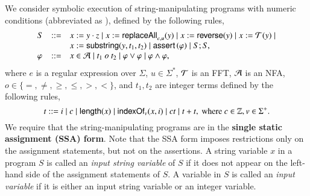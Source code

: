 
We consider symbolic execution of string-manipulating programs with numeric conditions (abbreviated as {\slint}), defined by the following rules, 
%
\[
\begin{array}{l c l}
S &::= &  x:= y \cdot z \mid x:= \mathsf{replaceAll}_{e,u}(y) \mid   x:=\mathsf{reverse}(y) \mid x:=\mathcal{T}(y) \mid \\
& & x := \mathsf{substring}(y, t_1, t_2)  \mid \textsf{assert}\left(\varphi\right)  \mid S;S, \\
\varphi &::= & x \in \mathcal{A} \mid t_1\ o\ t_2 \mid \varphi \vee \varphi \mid \varphi \wedge \varphi,
\end{array}
\]
where $e$ is a regular expression over $\Sigma$, $u \in \Sigma^*$, $\mathcal{T}$ is an FFT,  $\mathcal{A}$ is an NFA, $o \in \{=, \neq, \ge, \le, >, <\}$, and $t_1,t_2$ are integer terms defined by the following rules,
\[
t  ::= i \mid c \mid \mathsf{length}(x) \mid \mathsf{indexOf}_v(x, i) \mid  ct  \mid t + t, \mbox{ where } c \in \mathbb{Z}, v \in \Sigma^+.
\]
%
We require that the string-manipulating programs are in the {\bf single static assignment (SSA) form}. Note that the SSA form imposes restrictions only on the assignment statements, but not on the assertions. %
A string variable $x$ in a {\slint} program $S$ is called an \emph{input string variable} of $S$ if it does not appear on the left-hand side of the assignment statements of $S$. A variable in $S$ is called an \emph{input variable}  if it is either an input string variable or an integer variable.

